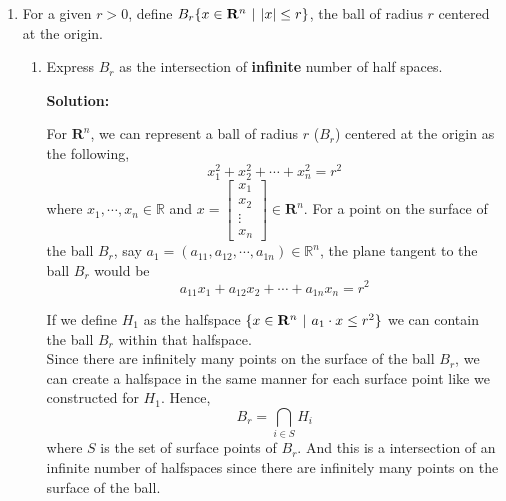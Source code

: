 \documentclass[12pt]{article}
\newenvironment{solution}
  {\par\noindent\textbf{Solution:}\par}
  {\par}
\begin{document}
\begin{enumerate}
\begin{enumerate}[label=\alph*.]
\begin{solution}
\begin{figure}[H]
\end{figure}

Which is can be contained in a ball of radius $3$ for instance, as shown in the figure, hence it is bounded.
\end{solution}

 \end{enumerate}

\item For a given $r > 0$, define $B_r \{ x \in \mathbf{R}^n \hspace{.05in} \vert \hspace{.05in} \vert x \vert \le r \}$, the ball of radius $r$ centered at the origin.
  \begin{enumerate}[label=\alph*.]
    \item Express $B_r$ as the intersection of \textbf{infinite} number of half spaces.
      \begin{solution}
        For $\mathbf{R}^n$, we can represent a ball of radius $r$ ($B_r$) centered at the origin as the following,
        $$x_1^2+x_2^2 + \cdots +x_n^2 = r^2$$
        where $x_1,\cdots,x_n \in \mathbb{R}$ and $x = \begin{bmatrix} x_1 \\ x_2 \\ \vdots \\ x_n \end{bmatrix} \in \mathbf{R}^n$.
        For a point on the surface of the ball $B_r$, say $a_1 = (a_{11},a_{12},\cdots,a_{1n}) \in \mathbb{R}^n$, the plane tangent to the ball $B_r$ would be 
        $$a_{11}x_1 + a_{12}x_2 + \cdots + a_{1n}x_n = r^2$$

        If we define $H_1$ as the halfspace $\{x \in \mathbf{R}^n \hspace{.05in} \vert \hspace{.05in} a_1 \cdot x \le r^2 \}$ we can contain the ball $B_r$ within that halfspace.
        \\ 
        Since there are infinitely many points on the surface of the ball $B_r$, we can create a halfspace in the same manner for each surface point like we constructed for $H_1$.
        Hence,
        $$B_r = \bigcap_{i \in S} H_i$$
        where $S$ is the set of surface points of $B_r$. And this is a intersection of an infinite number of halfspaces since there are infinitely many points on the surface of the ball.
  

\end{solution}
\end{enumerate}
\end{enumerate}
\end{document}
